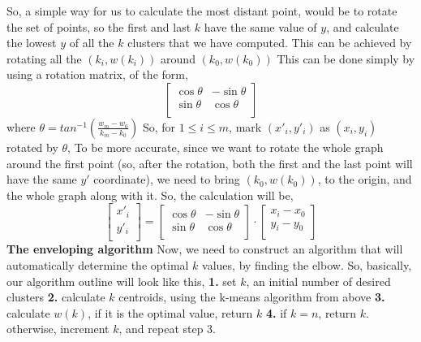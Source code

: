 \documentclass[12pt]{article}
\begin{document}
So, a simple way for us to calculate the most distant point, would be to rotate the set of points, \newline
so the first and last $k$ have the same value of $y$, and calculate the lowest $y$ of all the $k$ clusters
that we have computed. \newline
This can be achieved by rotating all the $(k_i,w(k_i))$ around $(k_0,w(k_0))$ \newline
This can be done simply by using a rotation matrix, of the form,
$$
\begin{bmatrix}
\cos\theta & -\sin\theta \\
\sin\theta & \cos\theta \\
\end{bmatrix}
$$
where $\theta=tan^{-1}(\frac{w_m-w_0}{k_m-k_0})$ \newline
So, for $1 \leq i \leq m$, mark $(x'_i,y'_i)$ as $(x_i,y_i)$ rotated by $\theta$, \newline
To be more accurate, since we want to rotate the whole graph around the first point \newline
(so, after the rotation, both the first and the last point will have the same $y'$ coordinate), \newline
we need to bring $(k_0,w(k_0))$, to the origin, and the whole graph along with it. \newline
So, the calculation will be, \newline
$$
\begin{bmatrix}
x'_i \\
y'_i \\
\end{bmatrix}=\begin{bmatrix}
\cos\theta & -\sin\theta \\
\sin\theta & \cos\theta \\
\end{bmatrix} \cdot \begin{bmatrix}
x_i-x_0 \\
y_i-y_0 \\
\end{bmatrix}
$$
\newpage
\textbf{\large The enveloping algorithm} \newline
Now, we need to construct an algorithm that will automatically determine the optimal $k$ values, by finding the elbow. So, basically, our algorithm outline will look like this, \newline
\textbf{1.} set $k$, an initial number of desired clusters \newline
\textbf{2.} calculate $k$ centroids, using the k-means algorithm from above \newline
\textbf{3.} calculate $w(k)$, if it is the optimal value, return $k$ \newline
\textbf{4.} if $k=n$, return $k$. otherwise, increment $k$, and repeat step 3. \newline
\end{document}

